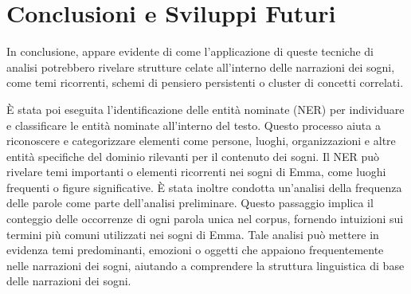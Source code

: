 \chapter*{Conclusioni e Sviluppi Futuri}

In conclusione, appare evidente di come l'applicazione di queste
tecniche di analisi potrebbero rivelare strutture celate all'interno delle narrazioni dei sogni, come temi ricorrenti,
schemi di pensiero persistenti o cluster di concetti correlati.

È stata poi eseguita l'identificazione delle entità nominate (NER) per individuare e classificare le entità nominate
all'interno del testo. Questo processo aiuta a riconoscere e categorizzare elementi come persone, luoghi,
organizzazioni e altre entità specifiche del dominio rilevanti per il contenuto dei sogni. Il NER può rivelare
temi importanti o elementi ricorrenti nei sogni di Emma, come luoghi frequenti o figure significative.
È stata inoltre condotta un'analisi della frequenza delle parole come parte dell'analisi preliminare.
Questo passaggio implica il conteggio delle occorrenze di ogni parola unica nel corpus, fornendo intuizioni sui
termini più comuni utilizzati nei sogni di Emma. Tale analisi può mettere in evidenza temi predominanti, emozioni o
oggetti che appaiono frequentemente nelle narrazioni dei sogni, aiutando a comprendere la struttura linguistica
di base delle narrazioni dei sogni.
